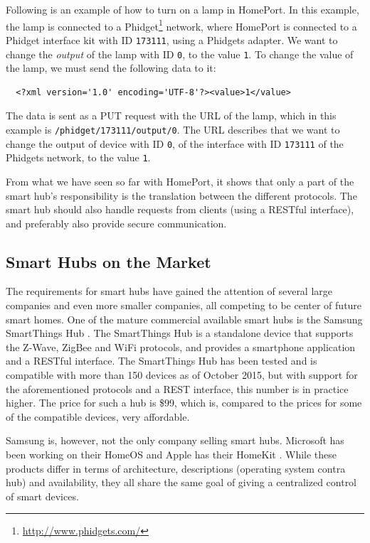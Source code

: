 Following is an example of how to turn on a lamp in HomePort.
In this example, the lamp is connected to a Phidget\footnote{\url{http://www.phidgets.com/}} network, 
where HomePort is connected to a Phidget interface kit with ID \texttt{173111}, 
using a Phidgets adapter. 
We want to change the \emph{output} of the lamp with ID \texttt{0}, 
to the value \texttt{1}. 
To change the value of the lamp, 
we must send the following data to it:

\begin{verbatim}
  <?xml version='1.0' encoding='UTF-8'?><value>1</value>
\end{verbatim}

The data is sent as a PUT request with the URL of the lamp, 
which in this example is \texttt{/phidget/173111/output/0}. 
The URL describes that we want to change the output of device with ID \texttt{0}, 
of the interface with ID \texttt{173111} of the Phidgets network, to the value \texttt{1}.

From what we have seen so far with HomePort, 
it shows that only a part of the smart hub's responsibility is the translation between the different protocols. 
The smart hub should also handle requests from clients (\eg using a RESTful interface), 
and preferably also provide secure communication. 

\subsection{Smart Hubs on the Market}\label{sec:smarthubsmarket}
The requirements for smart hubs have gained the attention of several large companies and even more smaller companies, 
all competing to be center of future smart homes. 
One of the mature commercial available smart hubs is the Samsung SmartThings Hub \cite{SMARTTHINGS}. 
The SmartThings Hub is a standalone device that supports the Z-Wave, ZigBee and WiFi protocols, 
and provides a smartphone application and a RESTful interface. 
The SmartThings Hub has been tested and is compatible with more than 150 devices as of October 2015,
but with support for the aforementioned protocols and a REST interface, this number is in practice higher.  
The price for such a hub is \$99, which is, compared to the prices for some of the compatible devices, very affordable. 

Samsung is, however, not the only company selling smart hubs. 
Microsoft has been working on their HomeOS \cite{HOMEOS} and Apple has their HomeKit \cite{HOMEKIT}.
While these products differ in terms of architecture, descriptions (operating system contra hub) and availability,
they all share the same goal of giving a centralized control of smart devices. 

